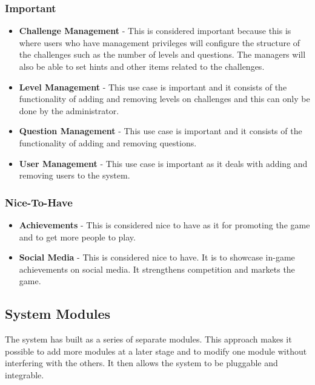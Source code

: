 \documentclass[english]{article}
\begin{document}
		\subsubsection{Important}
		\begin{itemize}
	  		\item \textbf{Challenge Management} - This is considered important because this is where users who have management privileges will configure the structure of the challenges such as the number of levels and questions. The managers will also be able to set hints and other items related to the challenges.
	  		\item \textbf{Level Management} - This use case is important and it consists of the functionality of adding and removing levels on challenges and this can only be done by the administrator. 
	  		\item \textbf{Question Management} - This use case is important and it consists of the functionality of adding and removing questions.
	  		\item \textbf{User Management} - This use case is important as it deals with adding and removing users to the system. 
	   \end{itemize} 
			
		\subsubsection{Nice-To-Have}
		\begin{itemize}
	  		\item \textbf{Achievements} - This is considered nice to have as it for promoting the game and to get more people to play.
	  		\item \textbf{Social Media} - This is considered nice to have. It is to showcase in-game achievements on social media. It strengthens competition and markets the game.
	   \end{itemize}
	   
		\newpage
		\subsection{System Modules}
		The system has built as a series of separate modules. This approach makes it possible to add more modules at a later stage and to modify one module without interfering with the others. It then allows the system to be pluggable and integrable.
		
\end{document}
